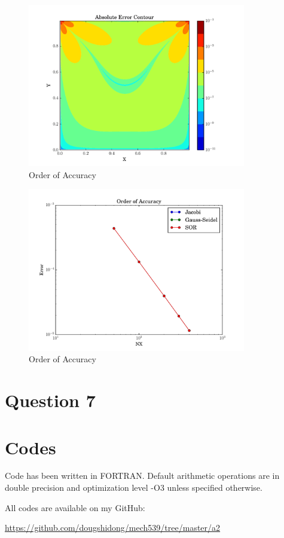 \documentclass[letterpaper,12pt,]{article}
\begin{document}
\begin{figure}[!h]
    \centering
    \includegraphics[width = 0.85\textwidth]{./Figures/ErrorContour.pdf}
    \caption{Order of Accuracy}
    \label{fig:errorc}
\end{figure}

\begin{figure}[!h]
    \centering
    \includegraphics[width = 0.85\textwidth]{./Figures/Error.pdf}
    \caption{Order of Accuracy}
    \label{fig:error}
\end{figure}


\section*{Question 7}

\section*{Codes}

Code has been written in FORTRAN. Default arithmetic operations are in double precision and optimization level -O3 unless specified otherwise.

All codes are available on my GitHub:

\url{https://github.com/dougshidong/mech539/tree/master/a2}


\end{document}
